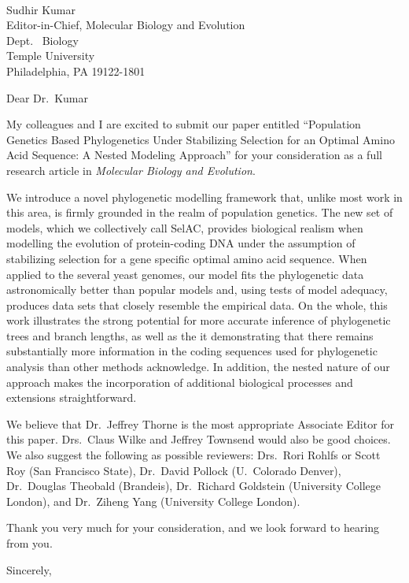 \documentclass[11pt,letterpaper]{letter}
\begin{document}
\begin{letter}{
\ \\
Sudhir Kumar\\
Editor-in-Chief, Molecular Biology and Evolution\\
Dept.~ Biology\\
Temple University\\
Philadelphia, PA 19122-1801 }


\opening{Dear Dr.~Kumar}

My colleagues and I are excited to submit our paper entitled “Population Genetics Based Phylogenetics Under Stabilizing Selection for an Optimal Amino Acid Sequence: A Nested Modeling Approach” for your consideration as a full research article in \emph{Molecular Biology and Evolution}.

We introduce a novel phylogenetic modelling framework that, unlike most work in this area, is firmly grounded in the realm of population genetics. 
The new set of models, which we collectively call SelAC, provides biological realism when modelling the evolution of protein-coding DNA under the assumption of stabilizing selection for a gene specific optimal amino acid sequence. 
When applied to the several yeast genomes, our model fits the phylogenetic data astronomically better than popular models and, using tests of model adequacy,  produces data sets that closely resemble the empirical data. 
On the whole, this work illustrates the strong potential for more accurate inference of phylogenetic trees and branch lengths, as well as the it demonstrating that there remains substantially more information in the coding sequences used for phylogenetic analysis than other methods acknowledge.
In addition, the nested nature of our approach makes the incorporation of additional biological processes and extensions straightforward. 

We believe that Dr.~Jeffrey Thorne is the most appropriate Associate Editor for this paper. Drs.~Claus Wilke and Jeffrey Townsend would also be good choices. 
We also suggest the following as possible reviewers: Drs.~Rori Rohlfs or Scott Roy (San Francisco State), Dr.~David Pollock (U.~Colorado Denver), Dr.~Douglas Theobald (Brandeis), Dr.~Richard Goldstein (University College London), and Dr.~Ziheng Yang (University College London).

Thank you very much for your consideration, and we look forward to hearing from you.


\closing{Sincerely,}
\end{letter}
\end{document}
